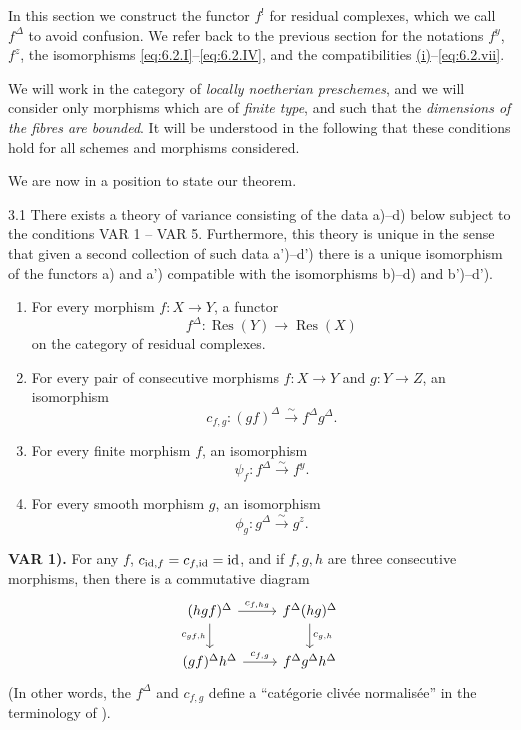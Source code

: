 In this section we construct the functor $f^{!}$ for residual complexes, which we call $f^{\Delta}$ to avoid confusion. We refer back to the previous section for the notations $f^{y}$, $f^{z}$, the isomorphisms \eqref{eq:6.2.I}--\eqref{eq:6.2.IV}, and the compatibilities \hyperref[compat:6.2.i]{(i)}--\eqref{eq:6.2.vii}.

We will work in the category of \emph{locally noetherian preschemes}, and we will consider only morphisms which are of \emph{finite type}, and such that the \emph{dimensions of the fibres are bounded}. It will be understood in the following that these conditions hold for all schemes and morphisms considered.

We are now in a position to state our theorem.

\begin{booktheorem}{3.1}\label{thm:6.3.1}
There exists a theory of variance consisting of the data a)--d) below subject to the conditions VAR 1 -- VAR 5. Furthermore, this theory is unique in the sense that given a second collection of such data a')--d') there is a unique isomorphism of the functors a) and a') compatible with the isomorphisms b)--d) and b')--d').

\begin{enumerate}
\item[a)] For every morphism $f\colon X\to Y$, a functor
\[
f^{\Delta}\colon \operatorname{Res}(Y)\longrightarrow \operatorname{Res}(X)
\]
on the category of residual complexes.
\item[b)] For every pair of consecutive morphisms $f\colon X\to Y$ and $g\colon Y\to Z$, an isomorphism
\[
c_{f,g}\colon (gf)^{\Delta} \xrightarrow{\sim} f^{\Delta}g^{\Delta}.
\]
\item[c)] For every finite morphism $f$, an isomorphism
\[
\psi_f\colon f^{\Delta} \xrightarrow{\sim} f^{y}.
\]
\item[d)] For every smooth morphism $g$, an isomorphism
\[
\phi_g\colon g^{\Delta} \xrightarrow{\sim} g^{z}.
\]
\end{enumerate}

\medskip{}\label{var:6.3.1}\noindent\textbf{VAR 1).} For any $f$, $c_{\operatorname{id},f}=c_{f,\operatorname{id}}=\operatorname{id}$, and if $f,g,h$ are three consecutive morphisms, then there is a commutative diagram
\[
\begin{tikzcd}
(hgf)^{\Delta} \ar[r,"c_{f,hg}"] \ar[d,"c_{gf,h}"'] & f^{\Delta}(hg)^{\Delta} \ar[d,"c_{g,h}"] \\
(gf)^{\Delta}h^{\Delta} \ar[r,"c_{f,g}"] & f^{\Delta}g^{\Delta}h^{\Delta}
\end{tikzcd}
\]
(In other words, the $f^{\Delta}$ and $c_{f,g}$ define a ``cat\'egorie cliv\'ee normalis\'ee'' in the terminology of \cite[--61, expos\'e~VI]{SGA}).


\end{booktheorem}
